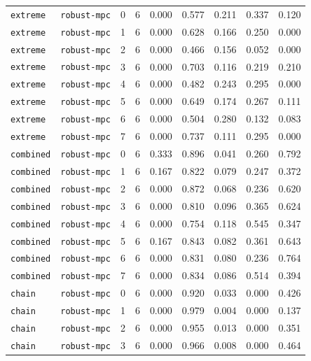 \documentclass{article}
\begin{document}
\begin{center}
\begin{tabular}{lllcccccc}
\texttt{extreme} & \texttt{robust-mpc} & 0 & 6 & 0.000 & 0.577 & 0.211 & 0.337 & 0.120 \\
\texttt{extreme} & \texttt{robust-mpc} & 1 & 6 & 0.000 & 0.628 & 0.166 & 0.250 & 0.000 \\
\texttt{extreme} & \texttt{robust-mpc} & 2 & 6 & 0.000 & 0.466 & 0.156 & 0.052 & 0.000 \\
\texttt{extreme} & \texttt{robust-mpc} & 3 & 6 & 0.000 & 0.703 & 0.116 & 0.219 & 0.210 \\
\texttt{extreme} & \texttt{robust-mpc} & 4 & 6 & 0.000 & 0.482 & 0.243 & 0.295 & 0.000 \\
\texttt{extreme} & \texttt{robust-mpc} & 5 & 6 & 0.000 & 0.649 & 0.174 & 0.267 & 0.111 \\
\texttt{extreme} & \texttt{robust-mpc} & 6 & 6 & 0.000 & 0.504 & 0.280 & 0.132 & 0.083 \\
\texttt{extreme} & \texttt{robust-mpc} & 7 & 6 & 0.000 & 0.737 & 0.111 & 0.295 & 0.000 \\
\texttt{combined} & \texttt{robust-mpc} & 0 & 6 & 0.333 & 0.896 & 0.041 & 0.260 & 0.792 \\
\texttt{combined} & \texttt{robust-mpc} & 1 & 6 & 0.167 & 0.822 & 0.079 & 0.247 & 0.372 \\
\texttt{combined} & \texttt{robust-mpc} & 2 & 6 & 0.000 & 0.872 & 0.068 & 0.236 & 0.620 \\
\texttt{combined} & \texttt{robust-mpc} & 3 & 6 & 0.000 & 0.810 & 0.096 & 0.365 & 0.624 \\
\texttt{combined} & \texttt{robust-mpc} & 4 & 6 & 0.000 & 0.754 & 0.118 & 0.545 & 0.347 \\
\texttt{combined} & \texttt{robust-mpc} & 5 & 6 & 0.167 & 0.843 & 0.082 & 0.361 & 0.643 \\
\texttt{combined} & \texttt{robust-mpc} & 6 & 6 & 0.000 & 0.831 & 0.080 & 0.236 & 0.764 \\
\texttt{combined} & \texttt{robust-mpc} & 7 & 6 & 0.000 & 0.834 & 0.086 & 0.514 & 0.394 \\
\texttt{chain} & \texttt{robust-mpc} & 0 & 6 & 0.000 & 0.920 & 0.033 & 0.000 & 0.426 \\
\texttt{chain} & \texttt{robust-mpc} & 1 & 6 & 0.000 & 0.979 & 0.004 & 0.000 & 0.137 \\
\texttt{chain} & \texttt{robust-mpc} & 2 & 6 & 0.000 & 0.955 & 0.013 & 0.000 & 0.351 \\
\texttt{chain} & \texttt{robust-mpc} & 3 & 6 & 0.000 & 0.966 & 0.008 & 0.000 & 0.464 \\
\bottomrule
\end{tabular}
\end{center}
\end{document}
